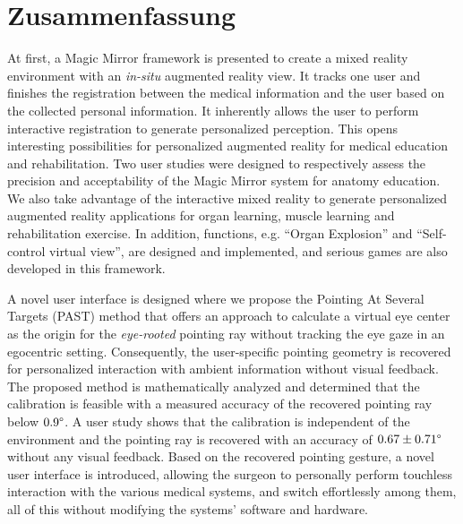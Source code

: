 %
\chapter*{Zusammenfassung}
\label{sec:Zusammenfassung}
At first, a Magic Mirror framework is presented to create a mixed reality environment with an \textit{in-situ} augmented reality view. It tracks one user and finishes the registration between the medical information and the user based on the collected personal information.
It inherently allows the user to perform interactive registration to generate personalized perception. This opens interesting possibilities for personalized augmented reality for medical education and rehabilitation. Two user studies were designed to respectively assess the precision and acceptability of the Magic Mirror system for anatomy education. 
We also take advantage of the interactive mixed reality to generate personalized augmented reality applications for organ learning, muscle learning and rehabilitation exercise. In addition, functions, e.g. ``Organ Explosion'' and ``Self-control virtual view'', are designed and implemented, and serious games are also developed in this framework.

A novel user interface is designed where we propose the Pointing At Several Targets (PAST) method that offers an approach to calculate a virtual eye center as the origin for the \textit{eye-rooted} pointing ray without tracking the eye gaze in an egocentric setting. Consequently, the user-specific pointing geometry is recovered for personalized interaction with ambient information without visual feedback.
The proposed method is mathematically analyzed and determined that the calibration is feasible with a measured accuracy of the recovered pointing ray below $0.9\degree$.
A user study shows that the calibration is independent of the environment and the pointing ray is recovered with an accuracy of $0.67 \pm 0.71\degree$ without any visual feedback. 
Based on the recovered pointing gesture, a novel user interface is introduced, allowing the surgeon to personally perform touchless interaction with the {various} medical systems, and switch effortlessly among them, all of this without modifying the systems' software and hardware.

